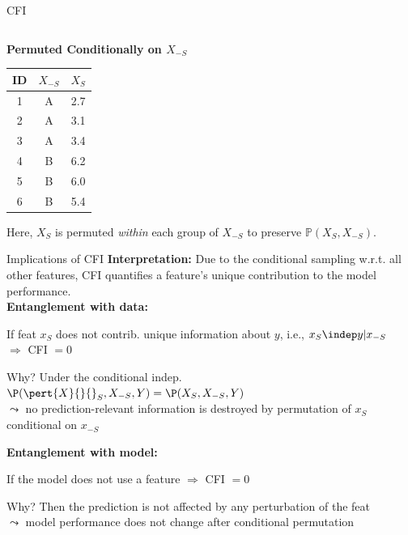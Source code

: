 \documentclass[10pt,compress,t,notes=noshow, xcolor=table]{beamer}
\begin{document}
\begin{framev}[align=top]{CFI  }
\begin{scriptsize}
{\begin{tabular}{ccc}
\bottomrule
\end{tabular}
\spacer[0.25]
}{
\centering
\textbf{Permuted Conditionally on $X_{-S}$}\\
\begin{tabular}{ccc}
\toprule
ID & $X_{-S}$ & $X_S$ \\
\midrule
1 & \cellcolor{blue!10}A & \cellcolor{blue!10}2.7 \\
2 & \cellcolor{blue!10}A & \cellcolor{blue!10}3.1 \\
3 & \cellcolor{blue!10}A & \cellcolor{blue!10}3.4 \\
\midrule
4 & \cellcolor{red!10}B & \cellcolor{red!10}6.2 \\
5 & \cellcolor{red!10}B & \cellcolor{red!10}6.0 \\
6 & \cellcolor{red!10}B & \cellcolor{red!10}5.4 \\
\bottomrule
\end{tabular}
\spacer[0.25]
}
\end{scriptsize}
\spacer[0.5]

Here, $X_S$ is permuted \textit{within} each group of $X_{-S}$ to preserve $\mathbb{P}(X_S, X_{-S})$.
\end{framev}


\begin{framev}[align=top]{Implications of CFI }
\textbf{Interpretation:} Due to the conditional sampling w.r.t. all other features, CFI quantifies a feature's unique contribution to the model performance.\\
\spacer[0.25]
\pause
\textbf{Entanglement with data:}
\begin{itemizeM}
\item If feat $x_S$ does not contrib. unique information about $y$, i.e., $x_S \indep y | x_{-S}$\\
$\Rightarrow$ CFI $= 0$
\item Why? Under the conditional indep.
$\P(\pert{X}{}{}_S, X_{-S}, Y) = \P(X_S, X_{-S}, Y)$
\\
$\leadsto$ no prediction-relevant information is destroyed by permutation of $x_S$ conditional on $x_{-S}$
\end{itemizeM}
\spacer[0.25]
\pause
\textbf{Entanglement with model:}
\begin{itemizeM}
\item If the model does not use a feature $\Rightarrow$ CFI $= 0$
\item Why? Then the prediction is not affected by any perturbation of the feat\\
$\leadsto$ model performance does not change after conditional permutation
\end{itemizeM}
\end{framev}
\end{document}
